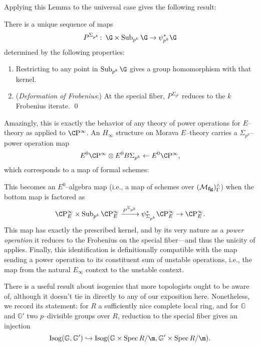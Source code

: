 Applying this Lemma to the universal case gives the following result:

\begin{corollary}\label{DeterminationOfPowerMaps}
There is a unique sequence of maps \[P^{\Sigma_{p^k}}\co \G \times \Sub_{p^k} \G \to \psi_{p^k}^* \G\] determined by the following properties:
\begin{enumerate}
    \item Restricting to any point in \(\Sub_{p^k} \G\) gives a group homomorphism with that kernel.
    \item (\textit{Deformation of Frobenius}:) At the special fiber, \(P^{\Sigma_{p^k}}\) reduces to the \(k\){\th} Frobenius iterate.
    \qed
\end{enumerate}
\end{corollary}

Amazingly, this is exactly the behavior of any theory of power operations for \(E\)--theory as applied to \(\CP^\infty\).  An \(H_\infty\) structure on Morava \(E\)--theory carries a \(\Sigma_{p^k}\)--power operation map \[E^0 \CP^\infty \otimes E^0 B\Sigma_{p^k} \from E^0 \CP^\infty,\] which corresponds to a map of formal schemes:
\begin{center}
\end{center}
This becomes an \(E^0\)--algebra map (i.e., a map of schemes over \((\mathcal{M}_{\mathbf{fg}})^\wedge_\Gamma\)) when the bottom map is factored as \[\CP^\infty_E \times \Sub_{p^k} \CP^\infty_E \xrightarrow{P^{\Sigma_{p^k}}} \psi_{\Sigma_{p^k}}^* \CP^\infty_E \to \CP^\infty_E.\]  This map has exactly the prescribed kernel, and by its very nature as a \emph{power operation} it reduces to the Frobenius on the special fiber---and thus the unicity of  applies.  Finally, this identification is definitionally compatible with the map sending a power operation to its constituent sum of unstable operations, i.e., the map from the natural \(E_\infty\) context to the unstable context.

\begin{remark}
There is a useful result about isogenies that more topologists ought to be aware of, although it doesn't tie in directly to any of our exposition here.  Nonetheless, we record its statement: for \(R\) a sufficiently nice complete local ring, and for \(\mathbb G\) and \(\mathbb G'\) two \(p\)--divisible groups over \(R\), reduction to the special fiber gives an injection \[\Isog(\mathbb G, \mathbb G') \into \Isog(\mathbb G \times \Spec R/\m, \mathbb G' \times \Spec R/\m).\]
\end{remark}











